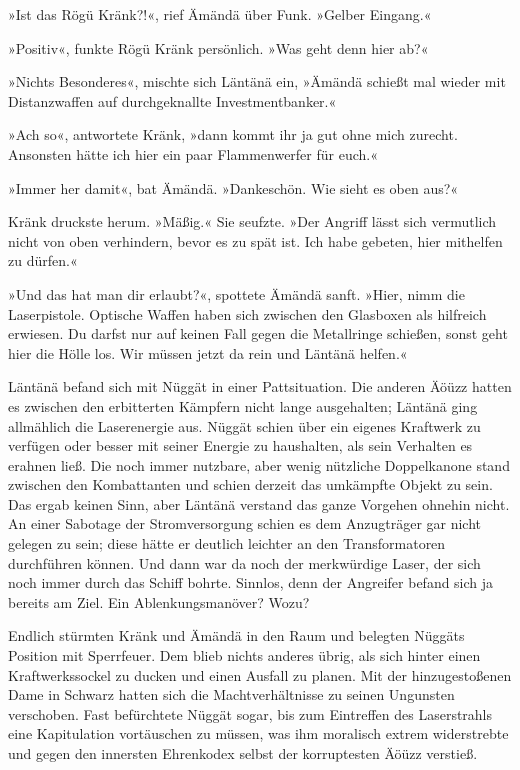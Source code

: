 »Ist das Rögü Kränk?!«, rief Ämändä über Funk. »Gelber Eingang.«

»Positiv«, funkte Rögü Kränk persönlich. »Was geht denn hier ab?«

»Nichts Besonderes«, mischte sich Läntänä ein, »Ämändä schießt mal wieder mit Distanzwaffen auf durchgeknallte Investmentbanker.«

»Ach so«, antwortete Kränk, »dann kommt ihr ja gut ohne mich zurecht. Ansonsten hätte ich hier ein paar Flammenwerfer für euch.«

»Immer her damit«, bat Ämändä. »Dankeschön. Wie sieht es oben aus?«

Kränk druckste herum. »Mäßig.« Sie seufzte. »Der Angriff lässt sich vermutlich nicht von oben verhindern, bevor es zu spät ist. Ich habe gebeten, hier mithelfen zu dürfen.«

»Und das hat man dir erlaubt?«, spottete Ämändä sanft. »Hier, nimm die Laserpistole. Optische Waffen haben sich zwischen den Glasboxen als hilfreich erwiesen. Du darfst nur auf keinen Fall gegen die Metallringe schießen, sonst geht hier die Hölle los. Wir müssen jetzt da rein und Läntänä helfen.«

Läntänä befand sich mit Nüggät in einer Pattsituation. Die anderen Äöüzz hatten es zwischen den erbitterten Kämpfern nicht lange ausgehalten; Läntänä ging allmählich die Laserenergie aus. Nüggät schien über ein eigenes Kraftwerk zu verfügen oder besser mit seiner Energie zu haushalten, als sein Verhalten es erahnen ließ. Die noch immer nutzbare, aber wenig nützliche Doppelkanone stand zwischen den Kombattanten und schien derzeit das umkämpfte Objekt zu sein. Das ergab keinen Sinn, aber Läntänä verstand das ganze Vorgehen ohnehin nicht. An einer Sabotage der Stromversorgung schien es dem Anzugträger gar nicht gelegen zu sein; diese hätte er deutlich leichter an den Transformatoren durchführen können. Und dann war da noch der merkwürdige Laser, der sich noch immer durch das Schiff bohrte. Sinnlos, denn der Angreifer befand sich ja bereits am Ziel. Ein Ablenkungsmanöver? Wozu?

Endlich stürmten Kränk und Ämändä in den Raum und belegten Nüggäts Position mit Sperrfeuer. Dem blieb nichts anderes übrig, als sich hinter einen Kraftwerkssockel zu ducken und einen Ausfall zu planen. Mit der hinzugestoßenen Dame in Schwarz hatten sich die Machtverhältnisse zu seinen Ungunsten verschoben. Fast befürchtete Nüggät sogar, bis zum Eintreffen des Laserstrahls eine Kapitulation vortäuschen zu müssen, was ihm moralisch extrem widerstrebte und gegen den innersten Ehrenkodex selbst der korruptesten Äöüzz verstieß.

